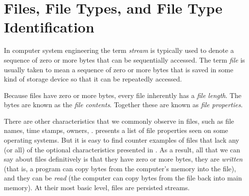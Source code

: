 \documentclass[11pt,letter]{article}
\begin{document}
\chapter{Files, File Types, and File Type Identification}

In computer system engineering the term \emph{stream} is typically
used to denote a sequence of zero or more bytes that can be
sequentially accessed. The term \emph{file} is usually taken to mean a
sequence of zero or more bytes that is saved in some kind of storage
device so that it can be repeatedly accessed. 

Because files have zero or more bytes, every file inherently has a
\emph{file length}. The bytes are known as the \emph{file contents}. Together these are known as \emph{file
  properties}. 

There are other characteristics that we
commonly observe in files, such as file names, time stamps, owners,
\etc.   presents a list of file
properties seen on some operating systems. But it is easy to find counter examples of files that lack any
(or all) of the optional characteristics presented in
. As a result, all that we
can say about files definitively is that they have zero or more bytes,
they are \emph{written} (that is, a program can copy bytes from
the computer's memory into the file), and they can be \emph{read}
(the computer can copy bytes from the file back into main memory). At
their most basic level, files are persisted streams. 
\end{document}
